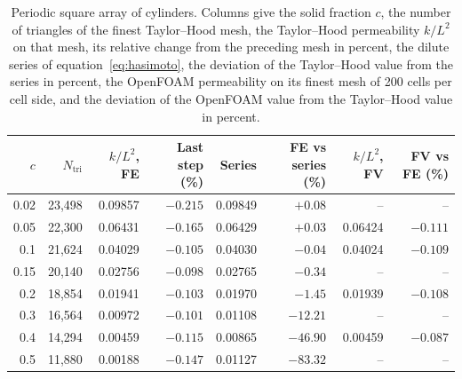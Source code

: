 \begin{table}[htbp]
\centering
\caption{Periodic square array of cylinders. Columns give the solid fraction $c$, the number of triangles of the finest Taylor--Hood mesh, the Taylor--Hood permeability $k/L^{2}$ on that mesh, its relative change from the preceding mesh in percent, the dilute series of equation~\eqref{eq:hasimoto}, the deviation of the Taylor--Hood value from the series in percent, the OpenFOAM permeability on its finest mesh of 200 cells per cell side, and the deviation of the OpenFOAM value from the Taylor--Hood value in percent.}
\label{tab:cylinders}
\small
\begin{tabular}{rrrrrrrr}
\toprule
$c$ & $N_{\mathrm{tri}}$ & $k/L^{2}$, FE & Last step (\%) & Series & FE vs series (\%) & $k/L^{2}$, FV & FV vs FE (\%) \\
\midrule
0.02 & 23,498 & 0.09857 & $-0.215$ & 0.09849 & $+0.08$ & -- & -- \\
0.05 & 22,300 & 0.06431 & $-0.165$ & 0.06429 & $+0.03$ & 0.06424 & $-0.111$ \\
0.1 & 21,624 & 0.04029 & $-0.105$ & 0.04030 & $-0.04$ & 0.04024 & $-0.109$ \\
0.15 & 20,140 & 0.02756 & $-0.098$ & 0.02765 & $-0.34$ & -- & -- \\
0.2 & 18,854 & 0.01941 & $-0.103$ & 0.01970 & $-1.45$ & 0.01939 & $-0.108$ \\
0.3 & 16,564 & 0.00972 & $-0.101$ & 0.01108 & $-12.21$ & -- & -- \\
0.4 & 14,294 & 0.00459 & $-0.115$ & 0.00865 & $-46.90$ & 0.00459 & $-0.087$ \\
0.5 & 11,880 & 0.00188 & $-0.147$ & 0.01127 & $-83.32$ & -- & -- \\
\bottomrule
\end{tabular}
\end{table}
